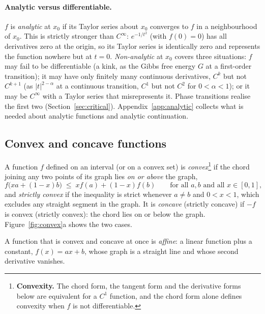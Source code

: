 \documentclass[10pt,a4paper]{article}
\theoremstyle{remark}
\begin{document}
\paragraph{Analytic versus differentiable.} $f$ is \emph{analytic} at $x_0$ if
its Taylor series about $x_0$ converges to $f$ in a neighbourhood of $x_0$.
This is strictly stronger than $C^{\infty}$: $e^{-1/t^{2}}$ (with $f(0)=0$)
has all derivatives zero at the origin, so its Taylor series is identically
zero and represents the function nowhere but at $t=0$. \emph{Non-analytic} at
$x_0$ covers three situations: $f$ may fail to be differentiable (a kink, as
the Gibbs free energy $G$ at a first-order transition); it may have only
finitely many continuous derivatives, $C^{k}$ but not $C^{k+1}$ (as
$|t|^{2-\alpha}$ at a continuous transition, $C^{1}$ but not $C^{2}$ for
$0<\alpha<1$); or it may be $C^{\infty}$ with a Taylor series that
misrepresents it. Phase transitions realise the first two
(Section~\ref{sec:critical}). Appendix~\ref{app:analytic} collects what is
needed about analytic functions and analytic continuation.

\subsection{Convex and concave functions}
\label{sec:convex}

A function $f$ defined on an interval (or on a convex set) is
\emph{convex}\footnote{\label{fn:convex}\textbf{Convexity.} The chord form,
the tangent form and the derivative forms below are equivalent for a $C^{1}$
function, and the chord form alone defines convexity when $f$ is not
differentiable.} if the chord joining
any two points of its graph lies \emph{on or above} the graph,
\begin{equation}\label{eq:chord}
  f\big(xa+(1-x)b\big)\;\leq\;x f(a)+(1-x)f(b)
  \qquad\text{for all } a,b \text{ and all } x\in[0,1] ,
\end{equation}
and \emph{strictly convex} if the inequality is strict whenever $a\neq b$ and
$0<x<1$, which excludes any straight segment in the graph. It is
\emph{concave} (strictly concave) if $-f$ is convex (strictly convex): the
chord lies on or below the graph. Figure~\ref{fig:convex}a shows the two
cases.

A function that is convex and concave at once is
\emph{affine}: a linear function plus a constant, $f(x)=ax+b$, whose graph
is a straight line and whose second derivative vanishes.
\end{document}

